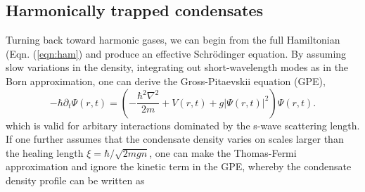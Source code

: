 

	
	
	
\subsection*{Harmonically trapped condensates}

	Turning back toward harmonic gases, we can begin from the full Hamiltonian (Eqn.
	(\ref{eqn:ham}) and produce an effective Schr\"{o}dinger equation.
	By assuming slow variations in the density, integrating out short-wavelength modes as in the Born approximation, one can derive the Gross-Pitaevskii equation (GPE),
	\begin{equation}
		-\hbar\partial_t\Psi(r,t) = \left(-\frac{\hbar^2\nabla^2}{2m} + V(r,t) + g|\Psi(r,t)|^2\right)\Psi(r,t).
		\label{eqn:GPE}
	\end{equation}
	which is valid for arbitary interactions dominated by the s-wave scattering length.
	 If one further assumes that the condensate density varies on scales larger than the healing length $\xi = \hbar/\sqrt{2mgn}$, one can make the Thomas-Fermi approximation and ignore the kinetic term in the GPE, whereby the condensate density profile can be written as

